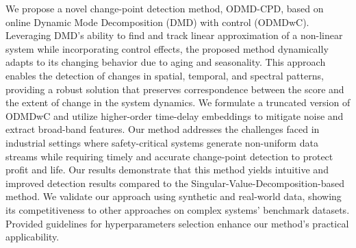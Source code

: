 We propose a novel change-point detection method, ODMD-CPD, based on online Dynamic Mode Decomposition (DMD) with control (ODMDwC). Leveraging DMD's ability to find and track linear approximation of a non-linear system while incorporating control effects, the proposed method dynamically adapts to its changing behavior due to aging and seasonality. This approach enables the detection of changes in spatial, temporal, and spectral patterns, providing a robust solution that preserves correspondence between the score and the extent of change in the system dynamics. We formulate a truncated version of ODMDwC and utilize higher-order time-delay embeddings to mitigate noise and extract broad-band features. Our method addresses the challenges faced in industrial settings where safety-critical systems generate non-uniform data streams while requiring timely and accurate change-point detection to protect profit and life. Our results demonstrate that this method yields intuitive and improved detection results compared to the Singular-Value-Decomposition-based method. We validate our approach using synthetic and real-world data, showing its competitiveness to other approaches on complex systems' benchmark datasets. Provided guidelines for hyperparameters selection enhance our method's practical applicability.
